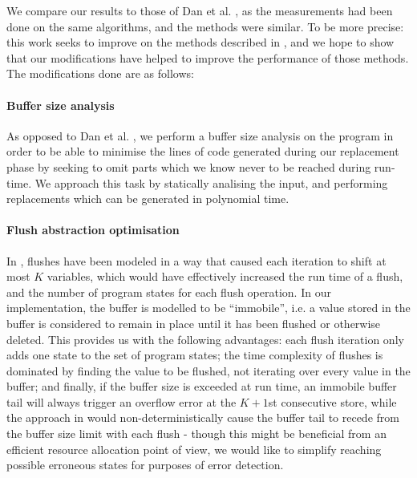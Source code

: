 We compare our results to those of Dan et al. \cite{danetal13}, as the measurements had been done on the same algorithms, and the methods were similar. To be more precise: this work seeks to improve on the methods described in \cite{danetal13}, and we hope to show that our modifications have helped to improve the performance of those methods. The modifications done are as follows:\\

\paragraph{Buffer size analysis}

As opposed to Dan et al. \cite{danetal13}, we perform a buffer size analysis on the program in order to be able to minimise the lines of code generated during our replacement phase by seeking to omit parts which we know never to be reached during run-time. We approach this task by statically analising the input, and performing replacements which can be generated in polynomial time.\\

\paragraph{Flush abstraction optimisation}

In \cite{danetal13}, flushes have been modeled in a way that caused each iteration to shift at most $K$ variables, which would have effectively increased the run time of a flush, and the number of program states for each flush operation. In our implementation, the buffer is modelled to be ``immobile'', i.e. a value stored in the buffer is considered to remain in place until it has been flushed or otherwise deleted. This provides us with the following advantages: each flush iteration only adds one state to the set of program states; the time complexity of flushes is dominated by finding the value to be flushed, not iterating over every value in the buffer; and finally, if the buffer size is exceeded at run time, an immobile buffer tail will always trigger an overflow error at the $K + 1$st consecutive store, while the approach in \cite{danetal13} would non-deterministically cause the buffer tail to recede from the buffer size limit with each flush - though this might be beneficial from an efficient resource allocation point of view, we would like to simplify reaching possible erroneous states for purposes of error detection.\\

